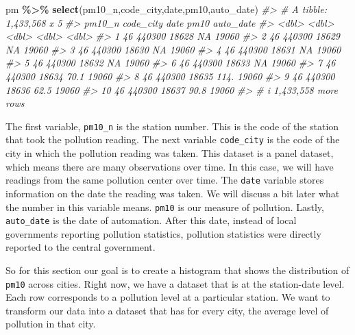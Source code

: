 \documentclass[
]{book}
\newenvironment{Shaded}{\begin{snugshade}}{\end{snugshade}}
\newcommand{\CommentTok}[1]{\textcolor[rgb]{0.56,0.35,0.01}{\textit{#1}}}
\newcommand{\FunctionTok}[1]{\textcolor[rgb]{0.13,0.29,0.53}{\textbf{#1}}}
\newcommand{\NormalTok}[1]{#1}
\newcommand{\SpecialCharTok}[1]{\textcolor[rgb]{0.81,0.36,0.00}{\textbf{#1}}}
\begin{document}
\begin{Shaded}
\begin{Highlighting}[]
\NormalTok{pm }\SpecialCharTok{\%\textgreater{}\%} \FunctionTok{select}\NormalTok{(pm10\_n,code\_city,date,pm10,auto\_date)}
\CommentTok{\#\textgreater{} \# A tibble: 1,433,568 x 5}
\CommentTok{\#\textgreater{}    pm10\_n code\_city  date  pm10 auto\_date}
\CommentTok{\#\textgreater{}     \textless{}dbl\textgreater{}     \textless{}dbl\textgreater{} \textless{}dbl\textgreater{} \textless{}dbl\textgreater{}     \textless{}dbl\textgreater{}}
\CommentTok{\#\textgreater{}  1     46    440300 18628  NA       19060}
\CommentTok{\#\textgreater{}  2     46    440300 18629  NA       19060}
\CommentTok{\#\textgreater{}  3     46    440300 18630  NA       19060}
\CommentTok{\#\textgreater{}  4     46    440300 18631  NA       19060}
\CommentTok{\#\textgreater{}  5     46    440300 18632  NA       19060}
\CommentTok{\#\textgreater{}  6     46    440300 18633  NA       19060}
\CommentTok{\#\textgreater{}  7     46    440300 18634  70.1     19060}
\CommentTok{\#\textgreater{}  8     46    440300 18635 114.      19060}
\CommentTok{\#\textgreater{}  9     46    440300 18636  62.5     19060}
\CommentTok{\#\textgreater{} 10     46    440300 18637  90.8     19060}
\CommentTok{\#\textgreater{} \# i 1,433,558 more rows}
\end{Highlighting}
\end{Shaded}

The first variable, \texttt{pm10\_n} is the station number. This is the code of the station that took the pollution reading. The next variable \texttt{code\_city} is the code of the city in which the pollution reading was taken. This dataset is a panel dataset, which means there are many observations over time. In this case, we will have readings from the same pollution center over time. The \texttt{date} variable stores information on the date the reading was taken. We will discuss a bit later what the number in this variable means. \texttt{pm10} is our measure of pollution. Lastly, \texttt{auto\_date} is the date of automation. After this date, instead of local governments reporting pollution statistics, pollution statistics were directly reported to the central government.

So for this section our goal is to create a histogram that shows the distribution of \texttt{pm10} across cities. Right now, we have a dataset that is at the station-date level. Each row corresponds to a pollution level at a particular station. We want to transform our data into a dataset that has for every city, the average level of pollution in that city.
\end{document}
